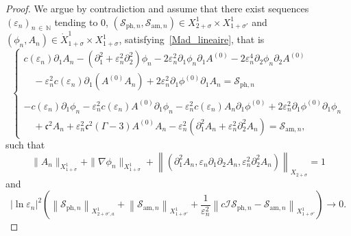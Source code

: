\documentclass[10pt]{amsart}
\theoremstyle{definition}\newtheorem{defi}[theo]{Definition}\newtheorem{rema}[theo]{Remark}\newtheorem{exam}[theo]{Example}\newtheorem{exem}[theo]{Example}\newtheorem{nota}[theo]{Notation}
\newcommand*\p{\partial}
\newcommand*\N{\mathbb N}
\newcommand{\amm}{\mathrm{am}}
\newcommand{\phl}{\mathrm{ph}}
\newcommand*\BI{\mathcal{I}}
\newcommand*\BS{\mathcal{S}}
\newcommand*\cs{{\mathfrak c}}
\newcommand*\e{\varepsilon}
\newcommand*\s{\sigma}
\begin{document}
\begin{proof} 
We argue by contradiction and assume that there exist sequences $ (\e_n)_{n\,\in\,\N} $ tending to $0$, $ (\BS_{{\phl},n}, \BS_{{\amm},n}) \in X^1_{2+\sigma} \times X^1_{1+ \sigma'} $ and $ (\phi_n, A_n) \in \dot{X}^1_{1+\s} \times X^1_{1+\s} $, satisfying~\eqref{Mad_lineaire}, that is
\begin{equation}\label{syst_absurde}
\left\{
\begin{array}{ll}
c (\e_n) \p_{1} A_n - \left(\p_{1}^2 + \e_n^2 \p^2_{2}\right) \phi_n - 2 \e_n^2 \p_{1} \phi_n \p_{1} A^{(0)} - 2 \e_n^4 \p_{2} \phi_n \p_{2} A^{(0)}
\\
\quad - \e_n^2 c(\e_n) \p_1 \left(A^{(0)} A_n\right) + 2 \e_n^2 \p_{1} \phi^{(0)} \p_{1} A_n = \BS_{{\phl},n} \\ \ \\
- c(\e_n) \p_{1} \phi_n - \e_n^2 c (\e_n) A^{(0)} \p_1 \phi_n - \e_n^2 c(\e_n) A_n \p_1 \phi^{(0)} + 2 \e_n^2 \p_{1} \phi^{(0)} \p_{1} \phi_n
\\
\quad + \cs^2 A_n + \e_n^2 \cs^2 (\Gamma -3) A^{(0)} A_n - \e_n^2 \left(\p_{1}^2 A_n + \e_n^2 \p_{2}^2 A_n\right) = \BS_{{\amm},n},
\end{array}\right.
\end{equation}
such that
\begin{equation}\label{hypoth1}
\| A_n \|_{ X^1_{ 1+\s} } + \| \nabla \phi_n \|_{ X^1_{ 1 +\s} } + \left\| \left(\p_1^2 A_n, \e_n \p_1\p_2 A_n, \e_n^2 \p_2^2 A_n \right)\right\|_{ X_{ 2+\s} } = 1
\end{equation}
and
\begin{equation}\label{hypoth2}
\lvert \ln \e_n \rvert^2 \left(\left\| \BS_{{\phl},n} \right\|_{ X^1_{2+\s', a} } + \left\| \BS_{{\amm},n} \right\|_{ X^1_{1+\s'} } + \frac{1}{\e_n^2} \left\| c \BI \BS_{{\phl},n} - \BS_{{\amm},n} \right\|_{ X^1_{1+\s'} }
\right)
\to 0.
\end{equation}


\end{proof}
\end{document}
